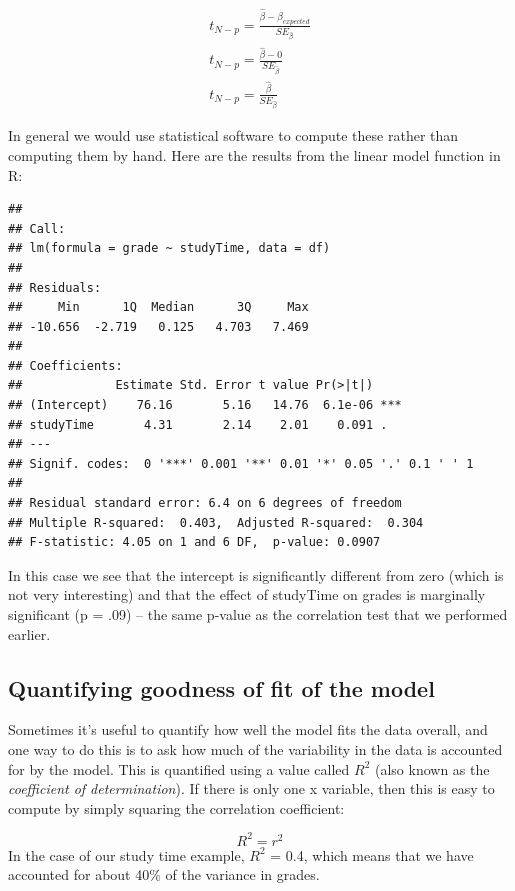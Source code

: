\documentclass[
  12pt,
]{book}
\begin{document}
\[
\begin{array}{c}
t_{N - p} = \frac{\hat{\beta} - \beta_{expected}}{SE_{\hat{\beta}}}\\
t_{N - p} = \frac{\hat{\beta} - 0}{SE_{\hat{\beta}}}\\
t_{N - p} = \frac{\hat{\beta} }{SE_{\hat{\beta}}}
\end{array}
\]

In general we would use statistical software to compute these rather than computing them by hand. Here are the results from the linear model function in R:

\begin{verbatim}
## 
## Call:
## lm(formula = grade ~ studyTime, data = df)
## 
## Residuals:
##     Min      1Q  Median      3Q     Max 
## -10.656  -2.719   0.125   4.703   7.469 
## 
## Coefficients:
##             Estimate Std. Error t value Pr(>|t|)    
## (Intercept)    76.16       5.16   14.76  6.1e-06 ***
## studyTime       4.31       2.14    2.01    0.091 .  
## ---
## Signif. codes:  0 '***' 0.001 '**' 0.01 '*' 0.05 '.' 0.1 ' ' 1
## 
## Residual standard error: 6.4 on 6 degrees of freedom
## Multiple R-squared:  0.403,  Adjusted R-squared:  0.304 
## F-statistic: 4.05 on 1 and 6 DF,  p-value: 0.0907
\end{verbatim}

In this case we see that the intercept is significantly different from zero (which is not very interesting) and that the effect of studyTime on grades is marginally significant (p = .09) -- the same p-value as the correlation test that we performed earlier.

\hypertarget{quantifying-goodness-of-fit-of-the-model}{%
\subsection{Quantifying goodness of fit of the model}\label{quantifying-goodness-of-fit-of-the-model}}

Sometimes it's useful to quantify how well the model fits the data overall, and one way to do this is to ask how much of the variability in the data is accounted for by the model. This is quantified using a value called \(R^2\) (also known as the \emph{coefficient of determination}). If there is only one x variable, then this is easy to compute by simply squaring the correlation coefficient:

\[
R^2 = r^2
\]
In the case of our study time example, \(R^2\) = 0.4, which means that we have accounted for about 40\% of the variance in grades.
\end{document}
